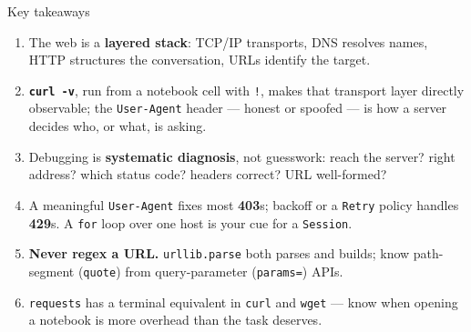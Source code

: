\documentclass[9pt,aspectratio=169]{beamer}
\begin{document}
\begin{frame}{Key takeaways}
    \begin{enumerate}\small
        \item The web is a \textbf{layered stack}: TCP/IP transports, DNS resolves names, HTTP structures the conversation, URLs identify the target.
        \item \textbf{\texttt{curl -v}}, run from a notebook cell with \texttt{!}, makes that transport layer directly observable; the \texttt{User-Agent} header --- honest or spoofed --- is how a server decides who, or what, is asking.
        \item Debugging is \textbf{systematic diagnosis}, not guesswork: reach the server? right address? which status code? headers correct? URL well-formed?
        \item A meaningful \texttt{User-Agent} fixes most \textbf{403}s; backoff or a \texttt{Retry} policy handles \textbf{429}s. A \texttt{for} loop over one host is your cue for a \texttt{Session}.
        \item \textbf{Never regex a URL.} \texttt{urllib.parse} both parses and builds; know path-segment (\texttt{quote}) from query-parameter (\texttt{params=}) APIs.
        \item \texttt{requests} has a terminal equivalent in \texttt{curl} and \texttt{wget} --- know when opening a notebook is more overhead than the task deserves.
    \end{enumerate}
    \bigskip
\end{frame}
\end{document}
